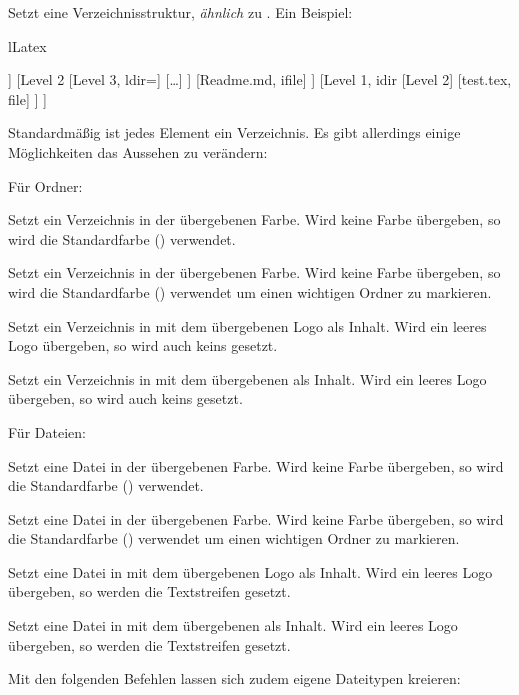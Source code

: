Setzt eine Verzeichnisstruktur, \emph{ähnlich} zu . Ein Beispiel:
\begin{defaultlst}[][listing side text,righthand width=4.5cm]{lLatex}
\begin{fancydir}
[Toplevel
    [Level 1, dir=AppleGreen
        [Level 2
            [Level 3]
            [\ldots, cfile={ChromeYellow}{X}]
        ]
        [Level 2
            [Level 3, ldir={\faApple}]
            [\ldots]
        ]
        [Readme.md, ifile]
    ]
    [Level 1, idir
        [Level 2]
        [test.tex, file]
    ]
]
\end{fancydir}
\end{defaultlst}
Standardmäßig ist jedes Element ein Verzeichnis. Es gibt allerdings einige Möglichkeiten das Aussehen zu verändern: \begin{ditemize}\narrowitems
        \item Für Ordner: \begin{ditemize}\narrowitems
        \item {} Setzt ein Verzeichnis in der übergebenen Farbe. Wird keine Farbe  übergeben, so wird die Standardfarbe () verwendet.
        \item {} Setzt ein Verzeichnis in der übergebenen Farbe. Wird keine Farbe übergeben, so wird die Standardfarbe () verwendet um einen wichtigen Ordner zu markieren.
        \item {} Setzt ein Verzeichnis in  mit dem übergebenen Logo als Inhalt. Wird ein leeres Logo übergeben, so wird auch keins gesetzt.
        \item {} Setzt ein Verzeichnis in  mit dem übergebenen  als Inhalt. Wird ein leeres Logo übergeben, so wird auch keins gesetzt.
    \end{ditemize}
    \item Für Dateien: \begin{ditemize}\narrowitems %
        \item {} Setzt eine Datei in der übergebenen Farbe. Wird keine Farbe  übergeben, so wird die Standardfarbe () verwendet.
        \item {} Setzt eine Datei in der übergebenen Farbe. Wird keine Farbe übergeben, so wird die Standardfarbe () verwendet um einen wichtigen Ordner zu markieren.
        \item {} Setzt eine Datei in  mit dem übergebenen Logo als Inhalt. Wird ein leeres Logo übergeben, so werden die Textstreifen gesetzt.
        \item {} Setzt eine Datei in  mit dem übergebenen  als Inhalt. Wird ein leeres Logo übergeben, so werden die Textstreifen gesetzt.
    \end{ditemize}
\end{ditemize}
Mit den folgenden Befehlen lassen sich zudem eigene Dateitypen kreieren:

